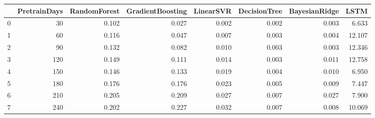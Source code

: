 \begin{tabular}{lrrrrrrr}
\toprule
{} &  PretrainDays &  RandomForest &  GradientBoosting &  LinearSVR &  DecisionTree &  BayesianRidge &   LSTM \\
\midrule
0 &            30 &         0.102 &             0.027 &      0.002 &         0.002 &          0.003 &  6.633 \\
1 &            60 &         0.116 &             0.047 &      0.007 &         0.003 &          0.004 & 12.107 \\
2 &            90 &         0.132 &             0.082 &      0.010 &         0.003 &          0.003 & 12.346 \\
3 &           120 &         0.149 &             0.111 &      0.014 &         0.003 &          0.011 & 12.758 \\
4 &           150 &         0.146 &             0.133 &      0.019 &         0.004 &          0.010 &  6.950 \\
5 &           180 &         0.176 &             0.176 &      0.023 &         0.005 &          0.009 &  7.447 \\
6 &           210 &         0.205 &             0.209 &      0.027 &         0.007 &          0.027 &  7.900 \\
7 &           240 &         0.202 &             0.227 &      0.032 &         0.007 &          0.008 & 10.069 \\
\bottomrule
\end{tabular}
